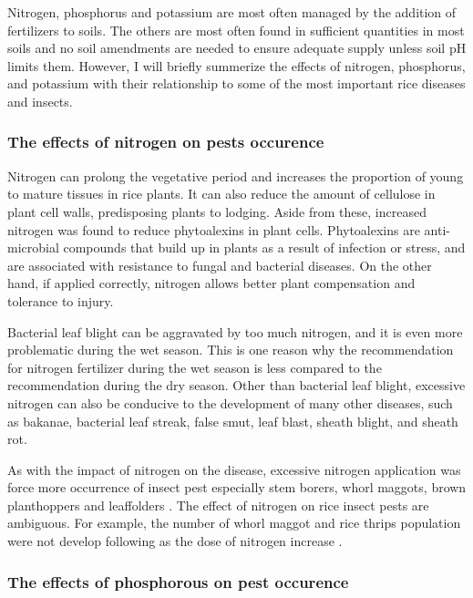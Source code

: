 \documentclass[12pt, oneside]{report}
\begin{document}
Nitrogen, phosphorus and potassium are most often managed by the addition of fertilizers to soils. The others are most often found in sufficient quantities in most soils and no soil amendments are needed to ensure adequate supply unless soil pH limits them. However, I will briefly summerize the effects of nitrogen, phosphorus, and potassium with their relationship to some of the most important rice diseases and insects.

\subsubsection{The effects of nitrogen on pests occurence}

Nitrogen can prolong the vegetative period and increases the proportion of young to mature tissues in rice plants. It can also reduce the amount of cellulose in plant cell walls, predisposing plants to lodging. Aside from these, increased nitrogen was found to reduce phytoalexins in plant cells. Phytoalexins are anti-microbial compounds that build up in plants as a result of infection or stress, and are associated with resistance to fungal and bacterial diseases. On the other hand, if applied correctly, nitrogen allows better plant compensation and tolerance to injury. 

Bacterial leaf blight can be aggravated by too much nitrogen, and it is even more problematic during the wet season. This is one reason why the recommendation for nitrogen fertilizer during the wet season is less compared to the recommendation during the dry season. Other than bacterial leaf blight, excessive nitrogen can also be conducive to the development of many other diseases, such as bakanae, bacterial leaf streak, false smut, leaf blast, sheath blight, and sheath rot.

As with the impact of nitrogen on the disease, excessive nitrogen application was force more occurrence of insect pest especially stem borers, whorl maggots, brown planthoppers and leaffolders \citep{chau2003impacts, litsinger2011cultural, rashid2014effect}. The effect of nitrogen on rice insect pests are ambiguous. For example, the number of whorl maggot and rice thrips population were not develop following as the dose of nitrogen increase \cite{chau2003impacts}.

\subsubsection{The effects of phosphorous on pest occurence}
\end{document}
